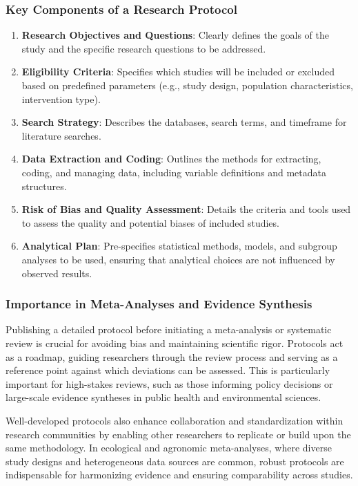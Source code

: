 \documentclass[
]{book}
\begin{document}
\subsubsection{Key Components of a Research Protocol}\label{key-components-of-a-research-protocol}

\begin{enumerate}
\def\labelenumi{\arabic{enumi}.}
\item
  \textbf{Research Objectives and Questions}: Clearly defines the goals of the study and the specific research questions to be addressed.
\item
  \textbf{Eligibility Criteria}: Specifies which studies will be included or excluded based on predefined parameters (e.g., study design, population characteristics, intervention type).
\item
  \textbf{Search Strategy}: Describes the databases, search terms, and timeframe for literature searches.
\item
  \textbf{Data Extraction and Coding}: Outlines the methods for extracting, coding, and managing data, including variable definitions and metadata structures.
\item
  \textbf{Risk of Bias and Quality Assessment}: Details the criteria and tools used to assess the quality and potential biases of included studies.
\item
  \textbf{Analytical Plan}: Pre-specifies statistical methods, models, and subgroup analyses to be used, ensuring that analytical choices are not influenced by observed results.
\end{enumerate}

\subsubsection{Importance in Meta-Analyses and Evidence Synthesis}\label{importance-in-meta-analyses-and-evidence-synthesis}

Publishing a detailed protocol before initiating a meta-analysis or systematic review is crucial for avoiding bias and maintaining scientific rigor.
Protocols act as a roadmap, guiding researchers through the review process and serving as a reference point against which deviations can be assessed.
This is particularly important for high-stakes reviews, such as those informing policy decisions or large-scale evidence syntheses in public health and environmental sciences.

Well-developed protocols also enhance collaboration and standardization within research communities by enabling other researchers to replicate or build upon the same methodology.
In ecological and agronomic meta-analyses, where diverse study designs and heterogeneous data sources are common, robust protocols are indispensable for harmonizing evidence and ensuring comparability across studies.
\end{document}
